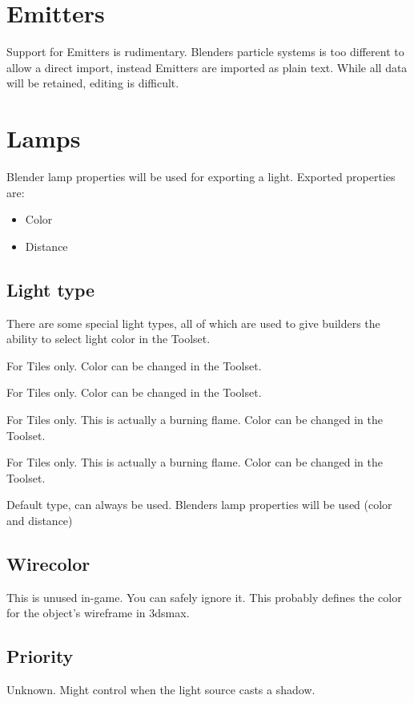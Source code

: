 \section{Emitters}
Support for Emitters is rudimentary. Blenders particle systems is too
different to allow a direct import, instead Emitters are imported as plain
text. While all data will be retained, editing is difficult.

\section{Lamps}
Blender lamp properties will be used for exporting a light.
Exported properties are:
\begin{itemize}
\item Color
\item Distance
\end{itemize}

\subsection*{Light type}
There are some special light types, all of which are used to give builders
the ability to select light color in the Toolset.
\begin{description}[leftmargin=6em,style=nextline]
    \item[Mainlight 1] For Tiles only. Color can be changed in the Toolset.
    \item[Mainlight 2] For Tiles only. Color can be changed in the Toolset.
    \item[Sourcelight 1] For Tiles only. This is actually a burning flame. Color can be changed in the Toolset.
    \item[Sourcelight 2] For Tiles only. This is actually a burning flame. Color can be changed in the Toolset.
    \item[Default] Default type, can always be used. Blenders lamp properties will be used (color and distance)
\end{description}

\subsection*{Wirecolor}
This is unused in-game. You can safely ignore it. This probably defines the
color for the object's wireframe in 3dsmax.

\subsection*{Priority}
Unknown. Might control when the light source casts a shadow.

